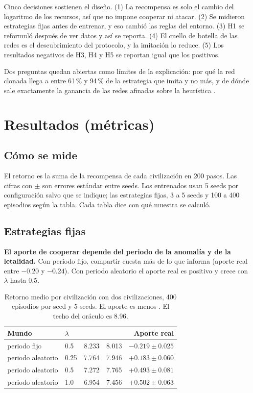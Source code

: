 \documentclass[11pt,a4paper]{article}
\newcommand{\codigo}[1]{\texttt{\detokenize{#1}}}
\begin{document}
Cinco decisiones sostienen el dise\~no. (1) La recompensa es solo el cambio del logaritmo de los recursos, as\'i que no impone cooperar ni atacar. (2) Se midieron estrategias fijas antes de entrenar, y eso cambi\'o las reglas del entorno. (3) H1 se reformul\'o despu\'es de ver datos y as\'i se reporta. (4) El cuello de botella de las redes es el descubrimiento del protocolo, y la imitaci\'on lo reduce. (5) Los resultados negativos de H3, H4 y H5 se reportan igual que los positivos.

Dos preguntas quedan abiertas como l\'imites de la explicaci\'on: por qu\'e la red clonada llega a entre 61\,\% y 94\,\% de la estrategia que imita y no m\'as, y de d\'onde sale exactamente la ganancia de las redes afinadas sobre la heur\'istica \codigo{solo}.

\section{Resultados (m\'etricas)}
\label{sec:resultados}

\subsection{C\'omo se mide}

El retorno es la suma de la recompensa de cada civilizaci\'on en 200 pasos. Las cifras con $\pm$ son errores est\'andar entre seeds. Los entrenados usan 5 seeds por configuraci\'on salvo que se indique; las estrategias fijas, 3 a 5 seeds y 100 a 400 episodios seg\'un la tabla. Cada tabla dice con qu\'e muestra se calcul\'o.

\subsection{Estrategias fijas}

\textbf{El aporte de cooperar depende del periodo de la anomal\'ia y de la letalidad.} Con periodo fijo, compartir cuesta m\'as de lo que informa (aporte real entre $-0.20$ y $-0.24$). Con periodo aleatorio el aporte real es positivo y crece con $\lambda$ hasta 0.5.

\begin{table}[H]
\centering\small
\begin{tabular}{@{}llrrr@{}}
\toprule
Mundo & $\lambda$ & \codigo{solo} & \codigo{coop_real} & Aporte real \\
\midrule
periodo fijo & 0.5 & 8.233 & 8.013 & $-0.219\pm0.025$ \\
periodo aleatorio & 0.25 & 7.764 & 7.946 & $+0.183\pm0.060$ \\
periodo aleatorio & 0.5 & 7.272 & 7.765 & $+0.493\pm0.081$ \\
periodo aleatorio & 1.0 & 6.954 & 7.456 & $+0.502\pm0.063$ \\
\bottomrule
\end{tabular}
\caption{Retorno medio por civilizaci\'on con dos civilizaciones, 400 episodios por seed y 5 seeds. El aporte es \codigo{coop_real} menos \codigo{solo}. El techo del or\'aculo es 8.96.}
\end{table}
\end{document}
